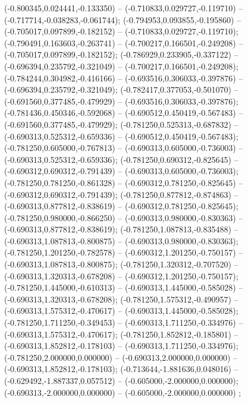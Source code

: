 (-0.800345,0.024441,-0.133350) -- (-0.710833,0.029727,-0.119710) -- (-0.717714,-0.038283,-0.061744);
 (-0.794953,0.093855,-0.195860) -- (-0.705017,0.097899,-0.182152) -- (-0.710833,0.029727,-0.119710);
 (-0.790491,0.163603,-0.263741) -- (-0.700217,0.166501,-0.249208) -- (-0.705017,0.097899,-0.182152);
 (-0.786929,0.233905,-0.337122) -- (-0.696394,0.235792,-0.321049) -- (-0.700217,0.166501,-0.249208);
 (-0.784244,0.304982,-0.416166) -- (-0.693516,0.306033,-0.397876) -- (-0.696394,0.235792,-0.321049);
 (-0.782417,0.377053,-0.501070) -- (-0.691560,0.377485,-0.479929) -- (-0.693516,0.306033,-0.397876);
 (-0.781436,0.450346,-0.592068) -- (-0.690512,0.450419,-0.567483) -- (-0.691560,0.377485,-0.479929);
 (-0.781250,0.525313,-0.687832) -- (-0.690313,0.525312,-0.659336) -- (-0.690512,0.450419,-0.567483);
 (-0.781250,0.605000,-0.767813) -- (-0.690313,0.605000,-0.736003) -- (-0.690313,0.525312,-0.659336);
 (-0.781250,0.690312,-0.825645) -- (-0.690312,0.690312,-0.791439) -- (-0.690313,0.605000,-0.736003);
 (-0.781250,0.781250,-0.861328) -- (-0.690312,0.781250,-0.825645) -- (-0.690312,0.690312,-0.791439);
 (-0.781250,0.877812,-0.874863) -- (-0.690313,0.877812,-0.838619) -- (-0.690312,0.781250,-0.825645);
 (-0.781250,0.980000,-0.866250) -- (-0.690313,0.980000,-0.830363) -- (-0.690313,0.877812,-0.838619);
 (-0.781250,1.087813,-0.835488) -- (-0.690313,1.087813,-0.800875) -- (-0.690313,0.980000,-0.830363);
 (-0.781250,1.201250,-0.782578) -- (-0.690312,1.201250,-0.750157) -- (-0.690313,1.087813,-0.800875);
 (-0.781250,1.320312,-0.707520) -- (-0.690313,1.320313,-0.678208) -- (-0.690312,1.201250,-0.750157);
 (-0.781250,1.445000,-0.610313) -- (-0.690313,1.445000,-0.585028) -- (-0.690313,1.320313,-0.678208);
 (-0.781250,1.575312,-0.490957) -- (-0.690313,1.575312,-0.470617) -- (-0.690313,1.445000,-0.585028);
 (-0.781250,1.711250,-0.349453) -- (-0.690313,1.711250,-0.334976) -- (-0.690313,1.575312,-0.470617);
 (-0.781250,1.852812,-0.185801) -- (-0.690313,1.852812,-0.178103) -- (-0.690313,1.711250,-0.334976);
 (-0.781250,2.000000,0.000000) -- (-0.690313,2.000000,0.000000) -- (-0.690313,1.852812,-0.178103);
 (-0.713644,-1.881636,0.048016) -- (-0.629492,-1.887337,0.057512) -- (-0.605000,-2.000000,0.000000);
 (-0.690313,-2.000000,0.000000) -- (-0.605000,-2.000000,0.000000) ;
